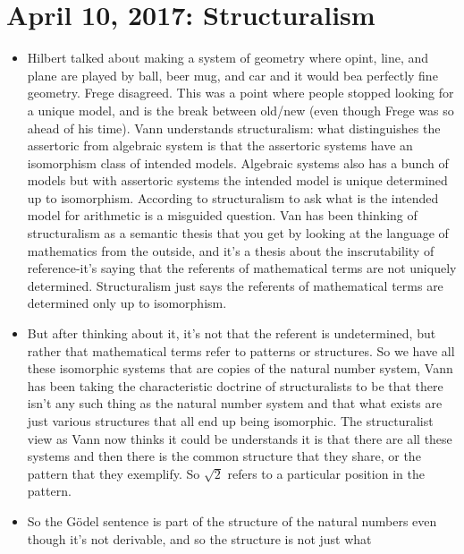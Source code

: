 \documentclass[12pt]{article}
\theoremstyle{definition}
\begin{document}
\section{April 10, 2017: Structuralism}

\begin{itemize}
    \itemsep0em 
    \item
        Hilbert talked about making a system of geometry where opint, line, and
        plane are played by ball, beer mug, and car and it would bea perfectly
        fine geometry. Frege disagreed. This was a point where people stopped
        looking for a unique model, and is the break between old/new (even
        though Frege was so ahead of his time). Vann understands structuralism:
        what distinguishes the assertoric from algebraic system is that the
        assertoric systems have an isomorphism class of intended models.
        Algebraic systems also has a bunch of models but with assertoric systems
        the intended model is unique determined up to isomorphism. According to
        structuralism to ask what is the intended model for arithmetic is a
        misguided question. Van has been thinking of structuralism as a
        semantic thesis that you get by looking at the language of mathematics
        from the outside, and it's a thesis about the inscrutability of
        reference-it's saying that the referents of mathematical terms are not
        uniquely determined. Structuralism just says the referents of
        mathematical terms are determined only up to isomorphism.
    \item
        But after thinking about it, it's not that the referent is
        undetermined, but rather that mathematical terms refer to patterns or
        structures. So we have all these isomorphic systems that are copies of
        the natural number system, Vann has been taking the characteristic
        doctrine of structuralists to be that there isn't any such thing as the
        natural number system and that what exists are just various structures
        that all end up being isomorphic. The structuralist view as Vann now
        thinks it could be understands it is that there are all these systems
        and then there is the common structure that they share, or the pattern
        that they exemplify. So $\sqrt{2}$ refers to a particular position in
        the pattern.
    \item
        So the G\"odel sentence is part of the structure of the natural numbers
        even though it's not derivable, and so the structure is not just what

\end{itemize}
\end{document}
